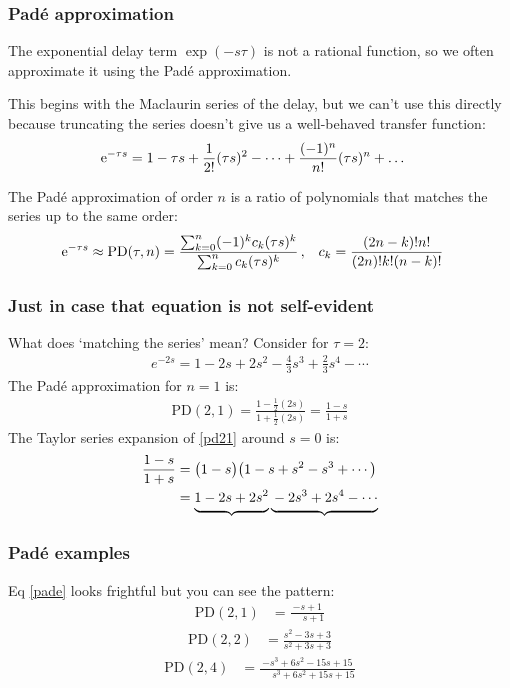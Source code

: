 \documentclass{beamer-control}
\begin{document}
\begin{frame}
\frametitle{Padé approximation}
The exponential delay term $\exp(-s\tau)$ is not a rational function,
so we often approximate it using the \alert{Padé approximation}.

This begins with the Maclaurin series of the delay, but we can't use this directly because truncating the series doesn't give us a well-behaved transfer function:
\begin{align}
\mathrm{e}^{-\tau s} &= 1 - \tau s + \frac{1}{2!}(\tau s)^2 - \dots + \frac{(-1)^n}{n!}(\tau s)^n + \dots 
\end{align}

The Padé approximation of order $n$ is a ratio of polynomials that matches the series up to the same order:
\begin{align}\label{eq:pade}
\mathrm{e}^{-\tau s} &\approx \mathrm{PD}(\tau,n) = \frac{ \sum_{k=0}^n (-1)^k c_k (\tau s)^k  }
                            { \sum_{k=0}^n        c_k (\tau s)^k  } \,, &
          c_k &= \frac{ (2n-k)!n! }{ (2n)!k!(n-k)! }
\end{align}

\end{frame}

\begin{frame}
\frametitle{Just in case that equation is not self-evident}

What does `matching the series' mean? Consider for $\tau=2$:
\begin{align}
e^{-2s} = 1 - 2s + 2s^2 - \tfrac{4}{3}s^3 + \tfrac{2}{3}s^4 - \cdots
\end{align}
The Padé approximation for $n=1$ is:
\begin{align}\label{eq:pd21}
\mathrm{PD}(2,1) = \frac{1 - \frac{1}{2}(2s)}{1 + \frac{1}{2}(2s)} = \frac{1 - s}{1 + s}
\end{align}
The Taylor series expansion of \eqref{pd21} around $s=0$ is:
\begin{align}
\frac{1 - s}{1 + s} &= \bigl(1 - s\bigr)\bigl(1 - s + s^2 - s^3 + \cdots\bigr) \\
& = \underbrace{\strut 1 - 2s + 2s^2}  \underbrace{\strut -2s^3 + 2s^4 - \cdots}
\end{align}
\end{frame}

\begin{frame}
\frametitle{Padé examples}

Eq \eqref{pade} looks frightful but you can see the pattern:
\begin{align}
\mathrm{PD}(2,1) &= \frac{  -s + 1 }{  \phantom{+}s + 1 } 
\end{align}
\begin{align}
\mathrm{PD}(2,2) &= \frac{  s^2 - 3 s + 3 }{  s^2 + 3 s + 3 } 
\end{align}
\begin{align}
\mathrm{PD}(2,4) &= \frac{ -s^3 + 6 s^2 - 15 s + 15 }{  \phantom{+}s^3 + 6 s^2 + 15 s + 15 }
\end{align}
\end{frame}
\end{document}
